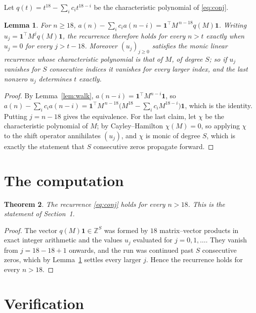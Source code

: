 \documentclass[11pt,a4paper]{article}
\theoremstyle{plain}
\newtheorem{theorem}{Theorem}
\newtheorem{lemma}[theorem]{Lemma}
\theoremstyle{definition}
\begin{document}
Let $q(t)=t^{18}-\sum_i c_i t^{18-i}$ be the characteristic polynomial of
\eqref{eq:conj}.

\begin{lemma}\label{lem:crit}
For $n\ge18$,
$a(n)-\sum_i c_i a(n-i)=\mathbf{1}^{\!\top}M^{\,n-18}q(M)\mathbf{1}$. Writing
$u_j=\mathbf{1}^{\!\top}M^{j}q(M)\mathbf{1}$, the recurrence therefore holds for every
$n>t$ exactly when $u_j=0$ for every $j>t-18$. Moreover $(u_j)_{j\ge0}$ satisfies the
monic linear recurrence whose characteristic polynomial is that of $M$, of degree $S$; so
if $u_j$ vanishes for $S$ consecutive indices it vanishes for every larger index, and the
last nonzero $u_j$ determines $t$ exactly.
\end{lemma}

\begin{proof}
By Lemma~\ref{lem:walk}, $a(n-i)=\mathbf{1}^{\!\top}M^{n-i}\mathbf{1}$, so
$a(n)-\sum_i c_i a(n-i)
=\mathbf{1}^{\!\top}M^{\,n-18}\bigl(M^{18}-\sum_i c_i M^{18-i}\bigr)
\mathbf{1}$, which is the identity. Putting $j=n-18$ gives the equivalence. For the
last claim, let $\chi$ be the characteristic polynomial of $M$; by Cayley--Hamilton
$\chi(M)=0$, so applying $\chi$ to the shift operator annihilates $(u_j)$, and $\chi$ is
monic of degree $S$, which is exactly the statement that $S$ consecutive zeros propagate
forward.
\end{proof}

\section{The computation}

\begin{theorem}
The recurrence \eqref{eq:conj} holds for every $n>18$. This is the statement of
Section~1.
\end{theorem}

\begin{proof}
The vector $q(M)\mathbf{1}\in\mathbb{Z}^{S}$ was formed by $18$ matrix--vector
products in exact integer arithmetic and the values $u_j$ evaluated for
$j=0,1,\dots$. They vanish from $j=18-18+1$ onwards, and the run was continued past
$S$ consecutive zeros, which by Lemma~\ref{lem:crit} settles every larger $j$. Hence the
recurrence holds for every $n>18$.
\end{proof}

\section{Verification}
\end{document}
